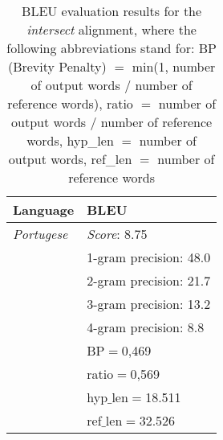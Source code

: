 \documentclass[11pt]{article}
\begin{document}
\begin{itemize}
\begin{center}
    \begin{table}
    \begin{tabular}{ | l | l |}
    \hline
    \textbf{Language} & \textbf{BLEU} \\ 
    \hline    
    \textit{Portugese} & \textit{Score}: 8.75 \\
    & 1-gram precision: 48.0 \\
    & 2-gram precision: 21.7 \\
    & 3-gram precision: 13.2 \\
    & 4-gram precision: 8.8 \\
    & BP$=$0,469 \\
    & ratio$=$0,569 \\
    & hyp$\_$len$=$18.511 \\
    & ref$\_$len$=$32.526\\
    \hline
    \end{tabular}
    \caption{BLEU evaluation results for the \textit{intersect} alignment, where the following abbreviations stand for: BP (Brevity Penalty) $=$ min(1, number of output words $/$ number of reference words), ratio $=$ number of output words $/$ number of reference words, hyp\_len $=$ number of output words, ref\_len $=$ number of reference words }
    \label{bleuIntersect}
    \end{table}
\end{center}

\end{itemize}
\end{document}

